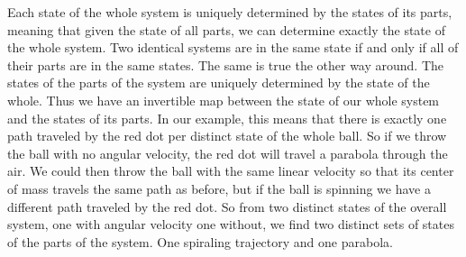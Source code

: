 \documentclass{article}
\begin{document}
	
	Each state of the whole system is uniquely determined by the states of its parts, meaning that given the state of all parts, we can determine exactly the state of the whole system. Two identical systems are in the same state if and only if all of their parts are in the same states. The same is true the other way around. The states of the parts of the system are uniquely determined by the state of the whole. Thus we have an invertible map between the state of our whole system and the states of its parts. In our example, this means that there is exactly one path traveled by the red dot per distinct state of the whole ball. So if we throw the ball with no angular velocity, the red dot will travel a parabola through the air. We could then throw the ball with the same linear velocity so that its center of mass travels the same path as before, but if the ball is spinning we have a different path traveled by the red dot. So from two distinct states of the overall system, one with angular velocity one without, we find two distinct sets of states of the parts of the system. One spiraling trajectory and one parabola.
		
	 
	 
\end{document}
